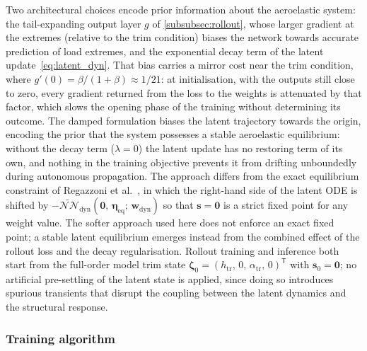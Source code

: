 Two architectural choices encode prior information about the aeroelastic system: the tail-expanding output layer $g$ of \cref{subsubsec:rollout}, whose larger gradient at the extremes (relative to the trim condition) biases the network towards accurate prediction of load extremes, and the exponential decay term of the latent update~\eqref{eq:latent_dyn}. That bias carries a mirror cost near the trim condition, where $g'(0) = \beta/(1+\beta) \approx 1/21$: at initialisation, with the outputs still close to zero, every gradient returned from the loss to the weights is attenuated by that factor, which slows the opening phase of the training without determining its outcome. The damped formulation biases the latent trajectory towards the
origin, encoding the prior that the system possesses a stable aeroelastic equilibrium: without
the decay term ($\lambda = 0$) the latent update has no restoring term of its own, and nothing
in the training objective prevents it from drifting unboundedly during autonomous propagation. The approach differs from the exact equilibrium constraint of
Regazzoni et al.~\cite{Regazzoni}, in which the right-hand side of the latent ODE is
shifted by $-\widetilde{\mathcal{NN}}_\mathrm{dyn}(\mathbf{0},\,\boldsymbol{\eta}_\mathrm{eq};\,
\mathbf{w}_\mathrm{dyn})$ so that $\mathbf{s} = \mathbf{0}$ is a strict fixed point for
any weight value. The softer approach used here does not enforce an exact fixed point; a
stable latent equilibrium emerges instead from the combined effect of the rollout loss and
the decay regularisation. Rollout training and inference both start from the full-order model trim state
$\boldsymbol{\zeta}_0 = (h_\mathrm{tr},\,0,\,\alpha_\mathrm{tr},\,0)^\mathsf{T}$ with
$\mathbf{s}_0 = \mathbf{0}$; no artificial pre-settling of the latent state is applied,
since doing so introduces spurious transients that disrupt the coupling between the latent
dynamics and the structural response.

\subsubsection{Training algorithm}
\label{subsubsec:training_algorithm}

